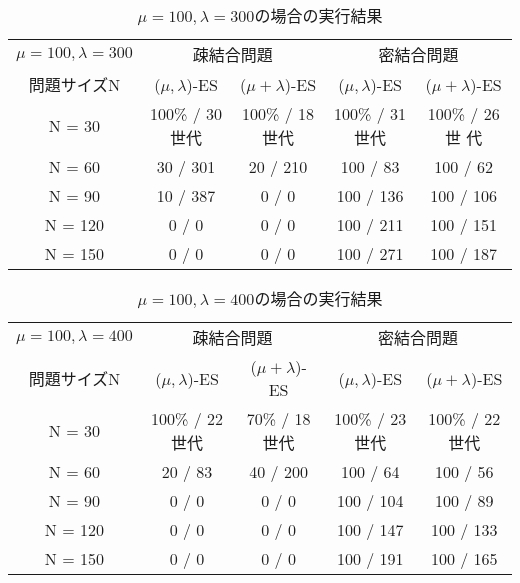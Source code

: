 \documentclass[a4j]{jarticle}
\begin{document}
\begin{table}[htb]
 \begin{center}
  \begin{tabular}[tb]{|c||c|c||c|c|} \hline
   $\mu = 100, \lambda = 300$& \multicolumn{2}{c||}{疎結合問題} &
   \multicolumn{2}{c|}{密結合問題} \\ \cline{2-5}
   問題サイズN& ($\mu, \lambda$)-ES& ($\mu + \lambda$)-ES& ($\mu, \lambda$)-ES&
   ($\mu + \lambda$)-ES \\ \hline \hline
   N = 30& 100\% / 30世代& 100\% / 18世代& 100\% / 31世代& 100\% / 26世
   代\\ \hline
   N = 60& 30 / 301& 20 / 210& 100 / 83& 100 / 62\\ \hline
   N = 90& 10 / 387& 0 / 0& 100 / 136& 100 / 106\\ \hline
   N = 120& 0 / 0&0 / 0 & 100 / 211& 100 / 151\\ \hline
   N = 150& 0 / 0&0 / 0& 100 / 271& 100 / 187\\ \hline
  \end{tabular}
  \caption{$\mu = 100, \lambda = 300$の場合の実行結果}
  \label{13}
 \end{center}
\end{table}

\begin{table}[htb]
 \begin{center}
  \begin{tabular}[tb]{|c||c|c||c|c|} \hline
   $\mu = 100, \lambda = 400$& \multicolumn{2}{c||}{疎結合問題} &
   \multicolumn{2}{c|}{密結合問題} \\ \cline{2-5}
   問題サイズN& ($\mu, \lambda$)-ES& ($\mu + \lambda$)-ES& ($\mu, \lambda$)-ES&
   ($\mu + \lambda$)-ES \\ \hline \hline
   N = 30& 100\% / 22世代& 70\% / 18世代& 100\% / 23世代& 100\% / 22世代\\ \hline
   N = 60& 20 / 83& 40 / 200 & 100 / 64& 100 / 56\\ \hline
   N = 90& 0 / 0 &0 / 0 & 100 / 104& 100 / 89\\ \hline
   N = 120& 0 / 0 &0 / 0 & 100 / 147& 100 / 133\\ \hline
   N = 150& 0 / 0 &0 / 0 & 100 / 191& 100 / 165\\ \hline
  \end{tabular}
  \caption{$\mu = 100, \lambda = 400$の場合の実行結果}
  \label{14}
 \end{center}
\end{table}
\end{document}
